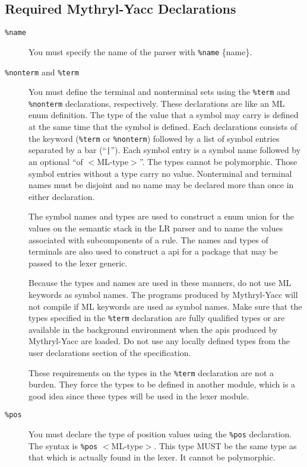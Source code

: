 \subsection{Required Mythryl-Yacc Declarations}
\begin{description}
\item[{\tt \%name}]
You must specify the name of the parser with {\tt \%name} \{name\}.
\item[{\tt \%nonterm} and {\tt \%term}]
You must define the terminal and nonterminal sets using the 
{\tt \%term} and {\tt \%nonterm}
declarations, respectively.  These declarations are like an ML enum
definition.
The type of the value that a symbol may carry is defined at the same time
that the symbol is defined.  Each declarations consists of the keyword
({\tt \%term} or {\tt \%nonterm})
followed by a list of symbol entries separated by a bar (``{\tt |}'').
Each symbol entry is a symbol name followed by an optional 
``of \/ $<$ML-type$>$''. The types cannot be polymorphic.
Those symbol entries without a type carry no value.
Nonterminal and terminal names must be disjoint and no name may be declared
more than once in either declaration.

The symbol names and types are used to construct a enum union for the
values on the semantic stack in the LR parser and to name the values
associated with subcomponents of a rule.  The names and types of 
terminals are also used to construct a api for a package that
may be passed to the lexer generic.

Because the types and names are used in these manners, do
not use ML keywords as symbol names.   The programs produced by Mythryl-Yacc
will not compile if ML keywords are used as symbol names.  
Make sure that the types specified in the {\tt \%term} declaration are
fully qualified types or are available in the background
environment when the apis produced by Mythryl-Yacc are loaded.  Do
not use any locally defined types from the user declarations section of
the specification.

These requirements on the types in the {\tt \%term} declaration are not
a burden.
They force the types to be defined in another module,
which is a good idea since these types will
be used in the lexer module.
\item[{\tt \%pos}]
You must declare the type of position values using the {\tt \%pos} declaration.
The syntax is {\tt \%pos} $<$ML-type$>$.
This type MUST be the same type as that which is actually found in the lexer.
It cannot be polymorphic.

\end{description}
